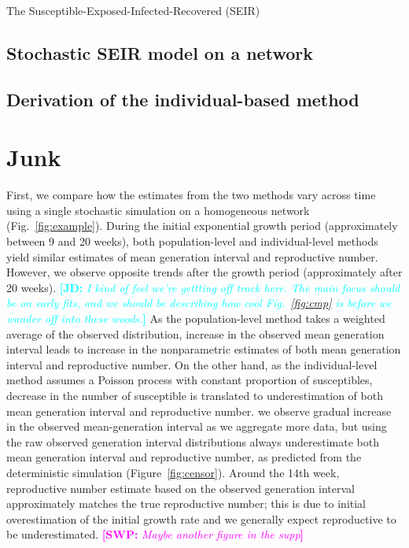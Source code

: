 \documentclass[12pt]{article}
\newcommand{\fref}[1]{Fig.~\ref{fig:#1}}
\newcommand{\comment}[3]{\textcolor{#1}{\textbf{[#2: }\textsl{#3}\textbf{]}}}
\newcommand{\jd}[1]{\comment{cyan}{JD}{#1}}
\newcommand{\swp}[1]{\comment{magenta}{SWP}{#1}}
\begin{document}
The Susceptible-Exposed-Infected-Recovered (SEIR) 

\subsection{Stochastic SEIR model on a network}


\subsection{Derivation of the individual-based method}


\pagebreak

\section{Junk}

First, we compare how the estimates from the two methods vary across time using a single stochastic simulation on a homogeneous network (\fref{example}).
During the initial exponential growth period (approximately between 9 and 20 weeks), both population-level and individual-level methods yield similar estimates of mean generation interval and reproductive number.
However, we observe opposite trends after the growth period (approximately after 20 weeks). \jd{I kind of feel we're gettting off track here. The main focus should be on early fits, and we should be describing how cool \fref{cmp} is before we wander off into these woods.}
As the population-level method takes a weighted average of the observed distribution, increase in the observed mean generation interval leads to increase in the nonparametric estimates of both mean generation interval and reproductive number.
On the other hand, as the individual-level method assumes a Poisson process with constant proportion of susceptibles, decrease in the number of susceptible is translated to underestimation of both mean generation interval and reproductive number.
we observe gradual increase in the observed mean-generation interval as we aggregate more data, but using the raw observed generation interval distributions always underestimate both mean generation interval and reproductive number, as predicted from the deterministic simulation (Figure~\ref{fig:censor}).
Around the 14th week, reproductive number estimate based on the observed generation interval approximately matches the true reproductive number; this is due to initial overestimation of the initial growth rate and we generally expect reproductive to be underestimated. \swp{Maybe another figure in the supp}
\end{document}
